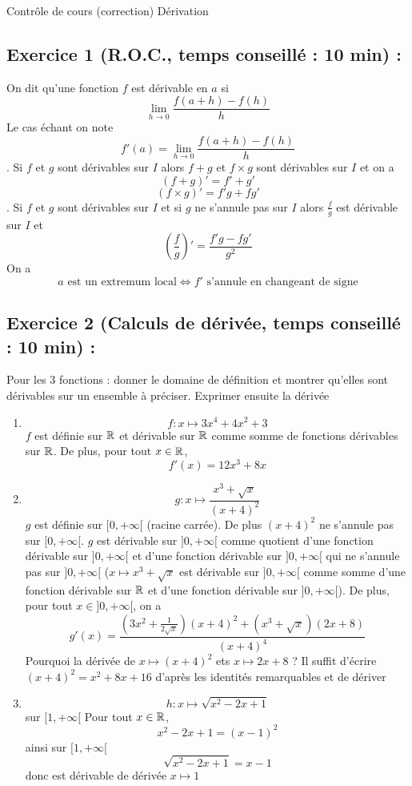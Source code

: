 

\usepackage{tkz-tab}


\center
\Large Contrôle de cours (correction)
\flushleft
\center
Dérivation
\flushleft \normalsize
\subsection*{Exercice 1 (R.O.C., temps conseillé : 10 min) : }
On dit qu'une fonction $f$ est dérivable en $a$ si $$\underset{h\rightarrow 0}{\lim} \frac{f(a+h) - f(h)}{h}$$ Le cas échant on note $$f'(a) = \underset{h\rightarrow 0}{\lim} \frac{f(a+h) - f(h)}{h}$$. Si $f$ et $g$ sont dérivables sur $I$ alors $f+g$ et $f\times g$ sont dérivables sur $I$ et on a $$(f+g)' = f'+g'$$ $$(f\times g)' = f'g+fg'$$. Si $f$ et $g$ sont dérivables sur $I$ et si $g$ ne s'annule pas sur $I$ alors $\frac{f}{g}$ est dérivable sur $I$ et $$\left(\frac{f}{g}\right)' = \frac{f'g-fg'}{g^2}$$ On a $$a \text{ est un extremum local} \Leftrightarrow f' \text{ s'annule en changeant de signe}$$
\subsection*{Exercice 2 (Calculs de dérivée, temps conseillé : 10 min) : }
Pour les 3 fonctions : donner le domaine de définition et montrer qu'elles sont dérivables sur un ensemble à préciser. Exprimer ensuite la dérivée
\begin{enumerate}
\item $$f:x\mapsto 3x^4+4x^2+3$$
$f$ est définie sur $\mathbb{R}$ et dérivable sur $\mathbb{R}$ comme somme de fonctions dérivables sur $\mathbb{R}$. De plus, pour tout $x \in \mathbb{R}$, $$\boxed{f'(x) = 12x^3 + 8x}$$
\item $$g:x\mapsto \frac{x^3 + \sqrt{x}}{(x+4)^2}$$
$g$ est définie sur $[0,+\infty[$ (racine carrée). De plus $(x+4)^2$ ne s'annule pas sur $[0,+\infty[$. $g$ est dérivable sur $]0,+\infty[$ comme quotient d'une fonction dérivable sur $]0,+\infty[$ et d'une fonction dérivable sur $]0,+\infty[$ qui ne s'annule pas sur $]0,+\infty[$ ($x\mapsto x^3 + \sqrt{x}$ est dérivable sur $]0,+\infty[$ comme somme d'une fonction dérivable sur $\mathbb{R}$ et d'une fonction dérivable sur $]0,+\infty[$). De plus, pour tout $x\in ]0,+\infty[$, on a$$\boxed{g'(x)=\frac{(3x^2 + \frac{1}{2\sqrt{x}})(x+4)^2 + (x^3 + \sqrt{x})(2x+8)}{(x+4)^4}}$$ Pourquoi la dérivée de $x\mapsto (x+4)^2$ ets $x\mapsto 2x+8$ ? Il suffit d'écrire $(x+4)^2 = x^2 + 8x + 16$ d'après les identités remarquables et de dériver
\item $$h:x\mapsto \sqrt{x^2-2x+1}$$ sur $[1,+\infty[$\newline
Pour tout $x\in \mathbb{R}$, 
$$x^2-2x+1 = (x-1)^2$$ 
ainsi sur $[1,+\infty[$
$$\sqrt{x^2-2x+1} = x-1$$ donc est dérivable de dérivée $x\mapsto 1$
\end{enumerate}
